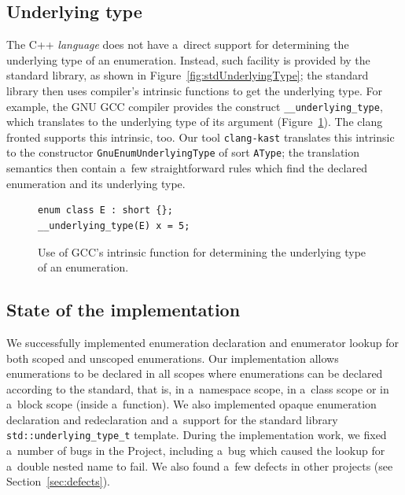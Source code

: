 \documentclass[nolot,nolof,nocover,printed]{fithesis3}
\newcommand{\clangKast}{\texttt{clang-kast}\xspace}
\newcommand{\Project}{Project\xspace}
\begin{document}
\subsection{Underlying type}

The C++ \textit{language} does not have a~direct support for determining the underlying type of an enumeration. Instead, such facility is provided by the standard library, as shown in Figure~\ref{fig:stdUnderlyingType}; the standard library then uses compiler's intrinsic functions to get the underlying type. For example, the GNU GCC compiler provides the construct \lstinline|__underlying_type|, which translates to the underlying type of its argument (Figure~\ref{fig:gccEnumUtIntrinsic}). The clang fronted supports this intrinsic, too. Our tool \clangKast translates this intrinsic to the constructor \lstinline|GnuEnumUnderlyingType| of sort \lstinline|AType|; the translation semantics then contain a~few straightforward rules which find the declared enumeration and its underlying type.

\begin{figure}[ht]
\begin{lstlisting}
enum class E : short {};
__underlying_type(E) x = 5;
\end{lstlisting}
\caption{Use of GCC's intrinsic function for determining the underlying type of an enumeration.}
\label{fig:gccEnumUtIntrinsic}
\end{figure}


\subsection{State of the implementation}


We successfully implemented enumeration declaration and enumerator lookup for both scoped and unscoped enumerations. Our implementation allows enumerations to be declared in all scopes where enumerations can be declared according to the standard, that is, in a~namespace scope, in a~class scope or in a~block scope (inside a~function). We also implemented opaque enumeration declaration and redeclaration and a~support for the standard library \lstinline|std::underlying_type_t| template. During the implementation work, we fixed a~number of bugs in the \Project, including a~bug which caused the lookup for a~double nested name to fail. We also found a~few defects in other projects (see Section~\ref{sec:defects}).
\end{document}
